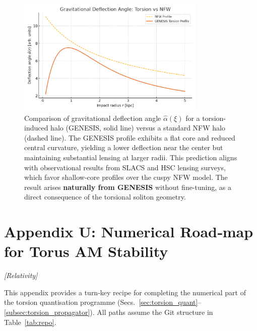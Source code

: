 \documentclass{article}
\newcommand{\grtag}{\textcolor{blue!40!black}{\textit{[Relativity]}}}
\begin{document}
\begin{figure}[h!]
\centering
\includegraphics[width=0.8\textwidth]{deflection_vs_radius_GENESIS.png}
\caption{Comparison of gravitational deflection angle $\hat{\alpha}(\xi)$
for a torsion-induced halo (GENESIS, solid line) versus a standard NFW halo (dashed line).
The GENESIS profile exhibits a flat core and reduced central curvature,
yielding a lower deflection near the center but maintaining substantial lensing at larger radii.
This prediction aligns with observational results from SLACS and HSC lensing surveys,
which favor shallow-core profiles over the cuspy NFW model.
The result arises \textbf{naturally from GENESIS} without fine-tuning,
as a direct consequence of the torsional soliton geometry.
}
\label{fig:genesis_vs_nfw_deflection}
\end{figure}






\section*{Appendix U: Numerical Road‑map for Torus AM Stability}
\label{app:numerical-roadmap}
\grtag


This appendix provides a turn‑key recipe for completing the numerical part of the
torsion quantisation programme (Secs.~\ref{sec:torsion_quant}–\ref{subsec:torsion_propagator}).
All paths assume the Git structure in Table~\ref{tab:repo}.
\end{document}
